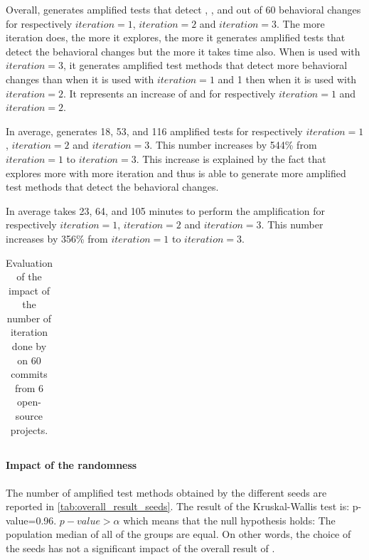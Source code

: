 Overall, \DCII generates amplified tests that detect , , and  out of 60 behavioral changes for respectively $iteration=1$, $iteration=2$ and $iteration=3$.
The more iteration \DCII does, the more it explores, the more it generates amplified tests that detect the behavioral changes but the more it takes time also.
When \DCII is used with $iteration=3$, it generates amplified test methods that detect  more behavioral changes than when it is used with $iteration=1$ and 1 then when it is used with $iteration=2$. It represents an increase of  and  for respectively $iteration=1$ and $iteration=2$.

In average, \DCII generates 18, 53, and 116 amplified tests for respectively $iteration=1$, $iteration=2$ and $iteration=3$. 
This number increases by 544\% from $iteration=1$ to $iteration=3$.
This increase is explained by the fact that \DCII explores more with more iteration and thus is able to generate more amplified test methods that detect the behavioral changes.

In average \DCII takes 23, 64, and 105 minutes to perform the amplification for respectively $iteration=1$, $iteration=2$ and $iteration=3$.
This number increases by 356\% from $iteration=1$ to $iteration=3$.

\begin{table}
\small
\def\arraystretch{0.7}%
\setlength\tabcolsep{4pt} %
\caption{Evaluation of the impact of the number of iteration done by \DCII on 60 commits from 6 open-source projects.}
\label{tab:overall_result_iteration}
\begin{tabular}{l|c|cc|cc|cc}

\end{tabular}
\end{table}

\paragraph{Impact of the randomness}

The number of amplified test methods obtained by the different seeds are reported in \autoref{tab:overall_result_seeds}.
The result of the Kruskal-Wallis test is:  p-value=0.96.
$p-value>\alpha$ which means that the null hypothesis holds: 
The population median of all of the groups are equal.
On other words, the choice of the seeds has not a significant impact of the overall result of \DCI.

